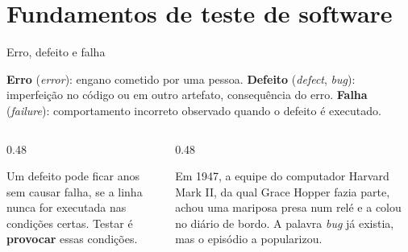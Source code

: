 \section{Fundamentos de teste de software}

\begin{frame}{Erro, defeito e falha}
  \begin{definicao}
    \textbf{Erro} (\emph{error}): engano cometido por uma pessoa.
    \textbf{Defeito} (\emph{defect}, \emph{bug}): imperfeição no código ou em outro artefato, consequência do erro.
    \textbf{Falha} (\emph{failure}): comportamento incorreto observado quando o defeito é executado.
  \end{definicao}
  \centering
  \vspace{2pt}
  \begin{columns}[T]
    \begin{column}{0.48\textwidth}
      \begin{conceito}[Consequência]
        Um defeito pode ficar anos sem causar falha, se a linha nunca for executada nas condições certas. Testar é \textbf{provocar} essas condições.
      \end{conceito}
    \end{column}
    \begin{column}{0.48\textwidth}
      \begin{historia}
        Em 1947, a equipe do computador Harvard Mark II, da qual Grace Hopper fazia parte, achou uma mariposa presa num relé e a colou no diário de bordo. A palavra \emph{bug} já existia, mas o episódio a popularizou.
      \end{historia}
    \end{column}
  \end{columns}
\end{frame}

